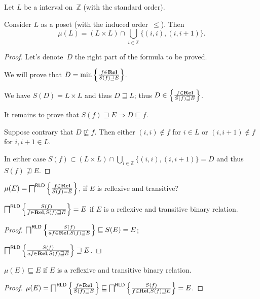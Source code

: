Let $L$ be a interval on~$\mathbb{Z}$ (with the standard order).

\begin{prop}
Consider $L$ as a poset (with the induced order~$\leq$). Then
\[ \mu(L) = (L\times L) \cap \bigcup_{i\in\mathbb{Z}} \{(i,i), (i,i+1)\}. \]
\end{prop}

\begin{proof}
Let's denote~$D$ the right part of the formula to be proved.

We will prove that $D = \min \left\{ \frac{f\in\mathbf{Rel}}{S(f)\sqsupseteq E}\right\}$.

We have $S(D)=L\times L$ and thus $D\sqsupseteq L$; thus $D\in\left\{ \frac{f\in\mathbf{Rel}}{S(f)\sqsupseteq E}\right\}$.

It remains to prove that $S(f)\sqsupseteq E\Rightarrow D\sqsubseteq f$.

Suppose contrary that $D\nsqsubseteq f$. Then either $(i,i)\notin f$ for $i\in L$ or $(i,i+1)\notin f$ for $i,i+1\in L$.

In either case $S(f)\subset (L\times L) \cap \bigcup_{i\in\mathbb{Z}} \{(i,i), (i,i+1)\} = D$
and thus $S(f)\nsqsupseteq E$.
\end{proof}

\begin{question}
$\mu(E) = \bigsqcap^{\mathsf{RLD}} \left\{ \frac{f\in\mathbf{Rel}}{S(f)=E}\right\}$, if $E$ is reflexive and transitive?
\end{question}

\begin{lem}
  $\bigsqcap^{\mathsf{RLD}} \left\{ \frac{ S (f) }{f
  \in \mathbf{Rel}, S (f) \sqsupseteq E }\right\} = E$ if $E$ is a
  reflexive and transitive binary relation.
\end{lem}

\begin{proof}
  $\bigsqcap^{\mathsf{RLD}} \left\{ \frac{ S (f) }{a f
  \in \mathbf{Rel}, S (f) \sqsupseteq E }\right\} \sqsubseteq S (E) =
  E$;

  $\bigsqcap^{\mathsf{RLD}} \left\{ \frac{ S (f) }{a f
  \in \mathbf{Rel}, S (f) \sqsupseteq E }\right\} \sqsupseteq E$.
\end{proof}

\begin{prop}
  $\mu (E) \sqsubseteq E$ if $E$ is a reflexive and transitive binary
  relation.
\end{prop}

\begin{proof}
  $\mu (E) = \bigsqcap^{\mathsf{RLD}} \left\{ \frac{ f \in
  \mathbf{Rel} }{ S (f) \sqsupseteq E
  }\right\} \sqsubseteq \bigsqcap^{\mathsf{RLD}} \left\{ \frac{ S (f)
  }{ f \in \mathbf{Rel}, S (f) \sqsupseteq E
  }\right\} = E$.
\end{proof}


